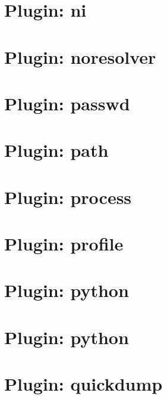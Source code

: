 \let\mypdfximage\pdfximage\def\pdfximage{\immediate\mypdfximage}\documentclass[twoside]{book}
\newcommand{\+}{\discretionary{\mbox{\scriptsize$\hookleftarrow$}}{}{}}
\begin{document}
\chapter{Plugin\+: ni}
\label{md_src_plugins_ni_README}

\chapter{Plugin\+: noresolver}
\label{md_src_plugins_noresolver_README}

\chapter{Plugin\+: passwd}
\label{md_src_plugins_passwd_README}

\chapter{Plugin\+: path}
\label{md_src_plugins_path_README}

\chapter{Plugin\+: process}
\label{md_src_plugins_process_README}

\chapter{Plugin\+: profile}
\label{md_src_plugins_profile_README}

\chapter{Plugin\+: python}
\label{md_src_plugins_python_python_dns_README}

\chapter{Plugin\+: python}
\label{md_src_plugins_python_README}

\chapter{Plugin\+: quickdump}
\label{md_src_plugins_quickdump_benchmarks}

\end{document}
